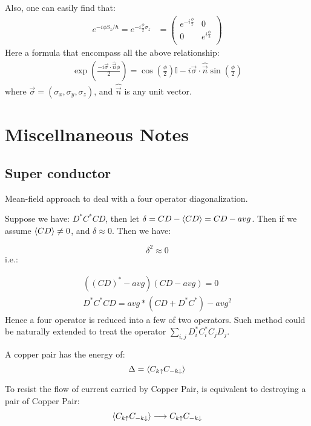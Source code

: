 \documentclass{article}
\numberwithin{equation}{subsection} %
\theoremstyle{definition}
\begin{document}
    Also, one can easily find that:
    \begin{align}
        e^{-i\phi S_z/\hbar}=e^{-i\frac{\phi}{2}\sigma_z}&=
          \left(\begin{array}{cc}
              e^{-i\frac{\phi }{2}} & 0 \\
              0                     & e^{i\frac{\phi }{2}} \\
         \end{array}\right)
    \end{align}
    Here a formula that encompass all the above relationship:
    \begin{align}
        \exp(\frac{-i\vec{\sigma}\cdot\hat{\vec{n}}\phi}{2})
        =
        \cos(\frac{\phi}{2})\mathbb{I}-i\vec\sigma\cdot\hat{\vec{n}}
        \sin(\frac{\phi}{2})
    \end{align}
    where $\vec\sigma=(\sigma_x,\sigma_y,\sigma_z)$, and 
    $\hat{\vec{n}}$ is any unit vector.
\section{Miscellnaneous Notes}
    \subsection{Super conductor}
    Mean-field approach to deal with a four operator diagonalization.
    
    Suppose we have: $D^*C^* CD$, then let $\delta = CD - \braket{CD} =
    CD - avg$. Then if we assume $\braket{CD}\neq 0$, and $\delta \approx 0$. Then we have:
    
    	$$ \delta^2 \approx 0 $$
    i.e.:
    
    \begin{align}
    	( (CD)^* - avg ) ( CD - avg ) = 0\\
    	D^*C^*CD = avg*(CD+D^*C^*) - avg^2
    \end{align}
    Hence a four operator is reduced into a few of two operators.
    Such method could be naturally extended to treat the operator
    $\sum_{i,j} D^*_i C^*_i C_j D_j$.
    
    A copper pair has the energy of:
    $$\Delta = \braket{C_{k \uparrow}C_{-k \downarrow} }$$
    
    To resist the flow of current carried by Copper Pair, is equivalent to destroying a pair of Copper Pair:
    $$ \braket{C_{k \uparrow}C_{-k \downarrow} } \longrightarrow C_{k \uparrow}C_{-k \downarrow}$$
    
\end{document}
